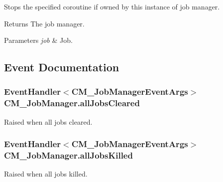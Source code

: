Stops the specified coroutine if owned by this instance of job manager. 

\begin{DoxyReturn}{Returns}
The job manager.
\end{DoxyReturn}

\begin{DoxyParams}{Parameters}
{\em job} & Job.\\
\hline
\end{DoxyParams}


\subsection{Event Documentation}
\hypertarget{class_c_m___job_manager_a292061e968b70d3271715d7a1c702db1}{}
\subsubsection[{all\+Jobs\+Cleared}]{\setlength{\rightskip}{0pt plus 5cm}Event\+Handler$<${\bf C\+M\+\_\+\+Job\+Manager\+Event\+Args}$>$ C\+M\+\_\+\+Job\+Manager.\+all\+Jobs\+Cleared\hspace{0.3cm}{\ttfamily [protected]}}\label{class_c_m___job_manager_a292061e968b70d3271715d7a1c702db1}


Raised when all jobs cleared. 

\hypertarget{class_c_m___job_manager_ac17ba0c89adf4dfa61d6b099f8029fa6}{}
\subsubsection[{all\+Jobs\+Killed}]{\setlength{\rightskip}{0pt plus 5cm}Event\+Handler$<${\bf C\+M\+\_\+\+Job\+Manager\+Event\+Args}$>$ C\+M\+\_\+\+Job\+Manager.\+all\+Jobs\+Killed\hspace{0.3cm}{\ttfamily [protected]}}\label{class_c_m___job_manager_ac17ba0c89adf4dfa61d6b099f8029fa6}


Raised when all jobs killed. 

\hypertarget{class_c_m___job_manager_a0dd6f2e0e4c7ead23dd25df03e23ddcb}{}
